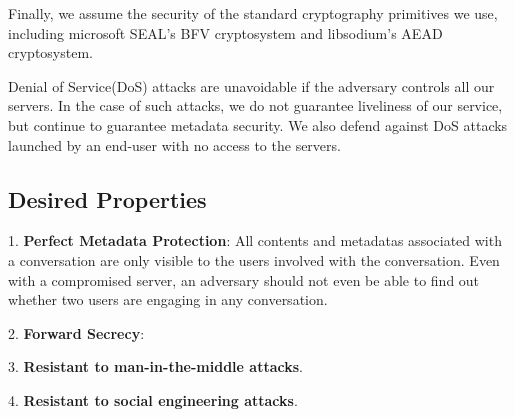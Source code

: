 Finally, we assume the security of the standard cryptography primitives we use, including microsoft SEAL's BFV cryptosystem and libsodium's AEAD cryptosystem. 

Denial of Service(DoS) attacks are unavoidable if the adversary controls all our servers. In the case of such attacks, we do not guarantee liveliness of our service, but continue to guarantee metadata security. We also defend against DoS attacks launched by an end-user with no access to the servers.

\subsection{Desired Properties}

1. \textbf{Perfect Metadata Protection}: All contents and metadatas associated with a conversation are only visible to the users involved with the conversation. Even with a compromised server, an adversary should not even be able to find out whether two users are engaging in any conversation.

2. \textbf{Forward Secrecy}: 

3. \textbf{Resistant to man-in-the-middle attacks}.

4. \textbf{Resistant to social engineering attacks}.




